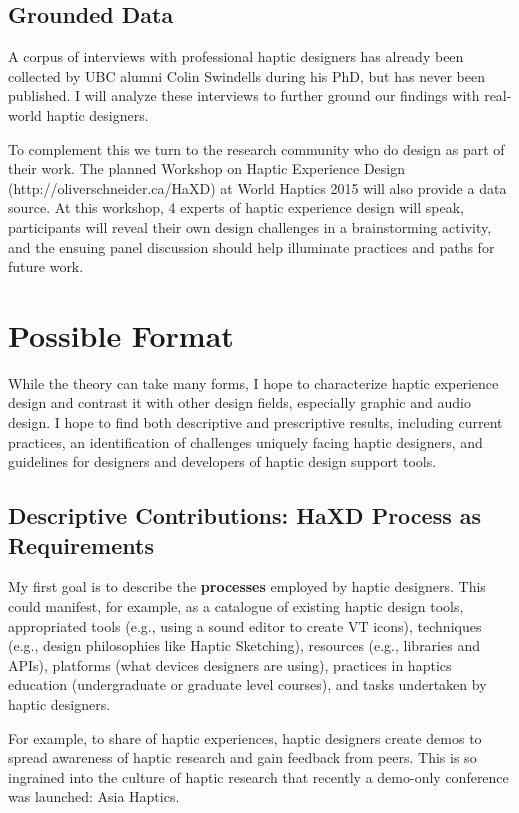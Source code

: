 \subsection{Grounded Data}
A corpus of interviews with professional haptic designers has already been collected by UBC alumni Colin Swindells during his PhD, but has never been published.
I will analyze these interviews to further ground our findings with real-world haptic designers.

To complement this %
we turn to the research community who do design as part of their work.
The planned Workshop on Haptic Experience Design (http://oliverschneider.ca/HaXD) at World Haptics 2015 will also provide a data source.
At this workshop, 4 experts of haptic experience design will speak, participants will reveal their own design challenges in a brainstorming activity, and the ensuing panel discussion should help illuminate practices and paths for future work.

%
%
\section{Possible Format}
While the theory can take many forms, I hope to characterize haptic experience design and contrast it with other design fields, especially graphic and audio design.
I hope to find both descriptive and prescriptive results, including current practices, an identification of challenges uniquely facing haptic designers, and guidelines for designers and developers of haptic design support tools.

\subsection{Descriptive Contributions: HaXD Process as Requirements}
My first goal is to describe the \textbf{processes} employed by haptic designers.
This could manifest, for example, as a catalogue of 
existing haptic design tools,
appropriated tools (e.g., using a sound editor to create VT icons),
techniques (e.g., design philosophies like Haptic Sketching),
resources (e.g., libraries and APIs),
platforms (what devices designers are using),
practices in haptics education (undergraduate or graduate level courses),
and tasks undertaken by haptic designers.

For example, to share of haptic experiences, haptic designers create demos
to spread awareness of haptic research and gain feedback from peers.
This is so ingrained into the culture of haptic research that recently a demo-only conference was launched: Asia Haptics.

